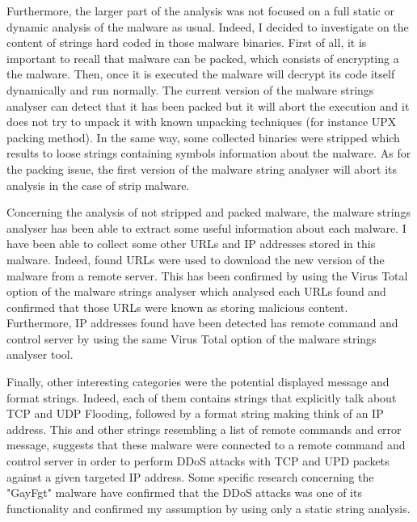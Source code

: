 Furthermore, the larger part of the analysis was not focused on a full static or dynamic 
analysis of the malware as usual. Indeed, I decided to investigate on the content of strings
hard coded in those malware binaries.
First of all, it is important to recall that malware can be packed, which consists of encrypting a the malware. Then, once it is executed the malware will decrypt its code itself dynamically
and run normally. The current version of the malware strings analyser can detect that it has
been packed but it will abort the execution and it does not try to unpack it with known
unpacking techniques (for instance UPX packing method). In the same way, some collected binaries
were stripped which results to loose strings containing symbols information about the malware.
As for the packing issue, the first version of the malware string analyser will abort its analysis
in the case of strip malware.

Concerning the analysis of not stripped and packed malware, the malware strings analyser has
been able to extract some useful information about each malware. I have been able
to collect some other URLs and IP addresses stored in this malware.
Indeed, found URLs were used to download the new version of the malware from a remote server.
This has been confirmed by using the Virus Total option of the malware strings analyser which
analysed each URLs found and confirmed that those URLs were known as storing malicious content.
Furthermore, IP addresses found have been detected has remote command and control server by
using the same Virus Total option of the malware strings analyser tool.

Finally, other interesting categories were the potential displayed message and format strings.
Indeed, each of them contains strings that explicitly talk about TCP and UDP Flooding, followed
by a format string making think of an IP address. This and other strings resembling a list
of remote commands and error message, suggests that these malware were connected to a 
remote command and control server in order to perform DDoS attacks with TCP and UPD packets
against a given targeted IP address. Some specific research concerning the "GayFgt" malware
have confirmed that the DDoS attacks was one of its functionality and confirmed my assumption
by using only a static string analysis.
